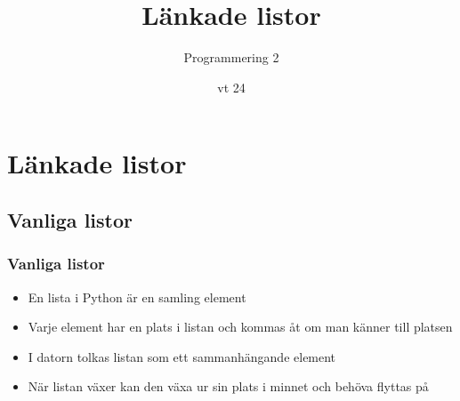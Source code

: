 \documentclass[aspectratio=169]{beamer}
\begin{document}

\newcommand{\fortt}{\texttt{for}}
\newcommand{\whilett}{\texttt{while}}
\newcommand{\iftt}{\texttt{if}}


\title{Länkade listor}
\date{vt 24}
\author{Programmering 2}

\maketitle

\tableofcontents

\section{Länkade listor}

\subsection{Vanliga listor}

\begin{frame}
	\frametitle{Vanliga listor}
	
	\begin{itemize}
		\item En lista i Python är en samling element
		\item Varje element har en plats i listan och kommas åt om man känner till platsen
		\item I datorn tolkas listan som ett sammanhängande element
		\item När listan växer kan den växa ur sin plats i minnet och behöva flyttas på
	\end{itemize}
	
\end{frame}
\end{document}
